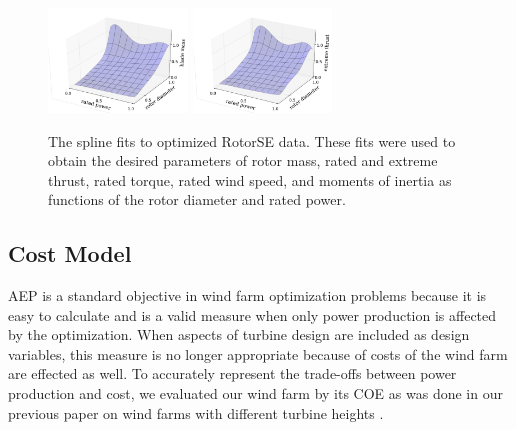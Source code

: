 \documentclass[wes, manuscript]{copernicus}
\begin{document}
\begin{figure}[htbp]
 \includegraphics[trim={2cm 0 0 0},clip,width=0.33\textwidth]{Figures/blade_mass.pdf}\label{blade_mass}
 \includegraphics[trim={2cm 0 0 0},clip,width=0.33\textwidth]{Figures/extreme_thrust.pdf}\label{extreme_thrust}
  \caption{\label{rotor_nacelle} The spline fits to optimized RotorSE data. These fits were used to obtain the desired parameters of rotor mass, rated and extreme thrust, rated torque, rated wind speed, and moments of inertia as functions of the rotor diameter and rated power.}
\end{figure}

	\subsection{Cost Model}
	

AEP is a standard objective in wind farm optimization problems because it is easy to calculate and is a valid measure when only power production is affected by the optimization. When aspects of turbine design are included as design variables, this measure is no longer appropriate because of costs of the wind farm are effected as well. To accurately represent the trade-offs between power production and cost, we evaluated our wind farm by its COE as was done in our previous paper on wind farms with different turbine heights \citep{stanley2018}.

\end{document}
